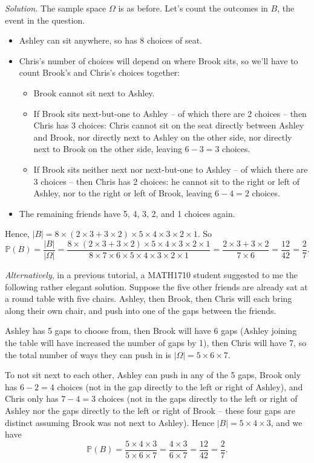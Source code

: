 \documentclass[
  a4paper,
]{book}
\providecommand{\tightlist}{%
  \setlength{\itemsep}{0pt}\setlength{\parskip}{0pt}}
\theoremstyle{definition}
\theoremstyle{definition}
\theoremstyle{definition}
\theoremstyle{definition}
\theoremstyle{remark}
\begin{document}
\begin{myanswers}
\emph{Solution.}
The sample space \(\Omega\) is as before. Let's count the outcomes in \(B\), the event in the question.

\begin{itemize}
\tightlist
\item
  Ashley can sit anywhere, so has 8 choices of seat.
\item
  Chris's number of choices will depend on where Brook sits, so we'll have to count Brook's and Chris's choices together:

  \begin{itemize}
  \tightlist
  \item
    Brook cannot sit next to Ashley.
  \item
    If Brook sits next-but-one to Ashley -- of which there are 2 choices -- then Chris has 3 choices: Chris cannot sit on the seat directly between Ashley and Brook, nor directly next to Ashley on the other side, nor directly next to Brook on the other side, leaving \(6-3=3\) choices.
  \item
    If Brook sits neither next nor next-but-one to Ashley -- of which there are 3 choices -- then Chris has 2 choices: he cannot sit to the right or left of Ashley, nor to the right or left of Brook, leaving \(6-4=2\) choices.
  \end{itemize}
\item
  The remaining friends have 5, 4, 3, 2, and 1 choices again.
\end{itemize}

Hence, \(|B| = 8 \times (2\times 3 + 3 \times 2) \times 5 \times 4 \times 3 \times 2 \times 1\). So
\[ \mathbb P(B) = \frac{|B|}{|\Omega|} = \frac{8 \times (2\times 3 + 3 \times 2) \times 5 \times 4 \times 3 \times 2 \times 1}{8 \times 7 \times 6 \times 5 \times 4 \times 3 \times 2 \times 1} = \frac{2\times 3 + 3 \times 2}{7 \times 6} = \frac{12}{42} = \frac{2}{7} .  \]

\emph{Alternatively}, in a previous tutorial, a MATH1710 student suggested to me the following rather elegant solution. Suppose the five other friends are already sat at a round table with five chairs. Ashley, then Brook, then Chris will each bring along their own chair, and push into one of the gaps between the friends.

Ashley has 5 gaps to choose from, then Brook will have 6 gaps (Ashley joining the table will have increased the number of gaps by 1), then Chris will have 7, so the total number of ways they can push in is \(|\Omega| = 5 \times 6 \times 7\).

To not sit next to each other, Ashley can push in any of the 5 gaps, Brook only has \(6 - 2 = 4\) choices (not in the gap directly to the left or right of Ashley), and Chris only has \(7 - 4 = 3\) choices (not in the gaps directly to the left or right of Ashley nor the gaps directly to the left or right of Brook -- these four gaps are distinct assuming Brook was not next to Ashley). Hence \(|B| = 5 \times 4 \times 3\), and we have
\[ \mathbb P(B) = \frac{5 \times 4 \times 3}{5 \times 6 \times 7} = \frac{4 \times 3}{6 \times 7} = \frac{12}{42} = \frac{2}{7}.  \]

\end{myanswers}
\end{document}

